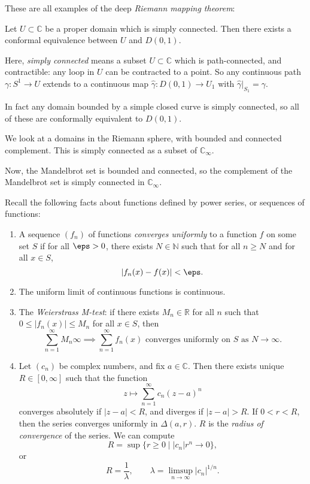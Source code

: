 \documentclass[12pt]{article}
\begin{document}
These are all examples of the deep \emph{Riemann mapping theorem}:

\begin{theorem}
	Let $U \subset \mathbb{C}$ be a proper domain which is simply connected. Then there exists a conformal equivalence between $U$ and $D(0,1)$.
\end{theorem}

Here, \emph{simply connected} means a subset $U \subset \mathbb{C}$ which is path-connected, and contractible: any loop in $U$ can be contracted to a point. So any continuous path $\gamma : S^{1} \to U$ extends to a continuous map $\hat \gamma : D(0,1) \to U_1$ with $\hat \gamma|_{S_1} = \gamma$.

In fact any domain bounded by a simple closed curve is simply connected, so all of these are conformally equivalent to $D(0,1)$.

\begin{exbox}
	We look at a domains in the Riemann sphere, with bounded and connected complement. This is simply connected as a subset of $\mathbb{C}_{\infty}$.

	Now, the Mandelbrot set is bounded and connected, so the complement of the Mandelbrot set is simply connected in $\mathbb{C}_{\infty}$.
\end{exbox}

Recall the following facts about functions defined by power series, or sequences of functions:

\begin{enumerate}[1.]
	\item A sequence $(f_n)$ of functions \emph{converges uniformly} to a function $f$ on some set $S$ if for all $\eps > 0$, there exists $N \in \mathbb{N}$ such that for all $n \geq N$ and for all $x \in S$,
		\[
		|f_n(x) - f(x)| < \eps
		.\]
	\item The uniform limit of continuous functions is continuous.
	\item The \emph{Weierstrass M-test}: if there exists $M_n \in \mathbb{R}$ for all $n$ such that $0 \leq |f_n(x)| \leq M_n$ for all $x \in S$, then
		\[
			\sum_{n = 1}^{\infty}M_n  \infty \implies \sum_{n = 1}^{\infty}f_n(x) \text{ converges uniformly on $S$ as $N \to \infty$}
		.\]
	\item Let $(c_n)$ be complex numbers, and fix $a \in \mathbb{C}$. Then there exists unique $R \in [0, \infty]$ such that the function
		\[
		z \mapsto \sum_{n = 1}^{\infty}c_n (z - a)^{n}
		\]
		converges absolutely if $|z - a| < R$, and diverges if $|z-a| > R$. If $0 < r < R$, then the series converges uniformly in $\Delta(a, r)$. $R$ is the \emph{radius of convergence} of the series. We can compute
		\[
			R = \sup\{r \geq 0 \mid |c_n|r^{n} \to 0\}
		,\]
		or
		\[
		R = \frac{1}{\lambda}, \qquad \lambda = \limsup_{n \to \infty} |c_n|^{1/n}
		.\]
\end{enumerate}
\end{document}
